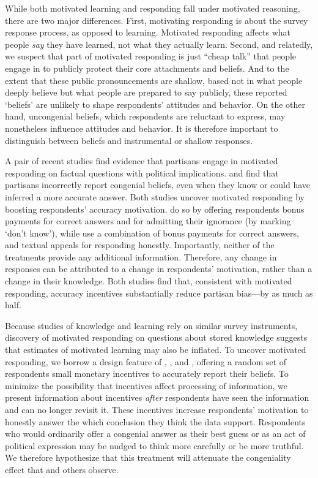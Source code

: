 \documentclass[12pt,letterpaper]{article}
\begin{document}
While both motivated learning and responding fall under motivated reasoning, there are two major differences. First, motivating responding is about the survey response process, as opposed to learning. Motivated responding affects what people {\it say} they have learned, not what they actually learn. Second, and relatedly, we suspect that part of motivated responding is just ``cheap talk'' that people engage in to publicly protect their core attachments and beliefs. And to the extent that these public pronouncements are shallow, based not in what people deeply believe but what people are prepared to say publicly, these reported `beliefs' are unlikely to shape respondents' attitudes and behavior. On the other hand, uncongenial beliefs, which respondents are reluctant to express, may nonetheless influence attitudes and behavior. It is therefore important to distinguish between beliefs and instrumental or shallow responses.

A pair of recent studies find evidence that partisans engage in motivated responding on factual questions with political implications. \citet{bullock2015} and \citet{prior2015} find that partisans incorrectly report congenial beliefs, even when they know or could have inferred a more accurate answer. Both studies uncover motivated responding by boosting respondents' accuracy motivation. \citet{bullock2015} do so by offering respondents bonus payments for correct answers and for admitting their ignorance (by marking `don't know'), while \citet{prior2015} use a combination of bonus payments for correct answers, and textual appeals for responding honestly. Importantly, neither of the treatments provide any additional information. Therefore, any change in responses can be attributed to a change in respondents' motivation, rather than a change in their knowledge. Both studies find that, consistent with motivated responding, accuracy incentives substantially reduce partisan bias---by as much as half. 

Because studies of knowledge and learning rely on similar survey instruments, discovery of motivated responding on questions about stored knowledge suggests that estimates of motivated learning may also be inflated. To uncover motivated responding, we borrow a design feature of \citet{prior2008}, \citet{bullock2015}, and \citet{prior2015}, offering a random set of respondents small monetary incentives to accurately report their beliefs. To minimize the possibility that incentives affect processing of information, we present information about incentives \textit{after} respondents have seen the information and can no longer revisit it. These incentives increase respondents' motivation to honestly answer the which conclusion they think the data support. Respondents who would ordinarily offer a congenial answer as their best guess or as an act of political expression may be nudged to think more carefully or be more truthful. We therefore hypothesize that this treatment will attenuate the congeniality effect that \citet{kahan2017} and others observe.
\end{document}
